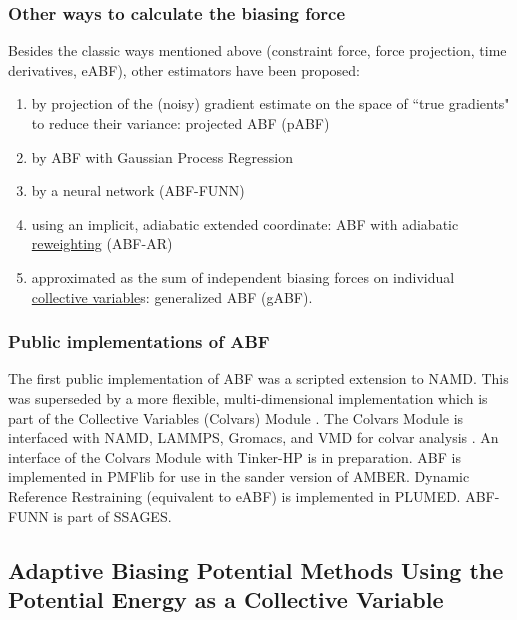 \documentclass[9pt,review]{livecoms}
\begin{document}
    
\subsubsection{Other ways to calculate the biasing force}
\label{sec:ABF_variants}

Besides the classic ways mentioned above (constraint force, force projection, time derivatives, eABF), other estimators have been proposed:
\begin{enumerate}
\item by projection of the (noisy) gradient estimate on the space of ``true gradients" to reduce their variance: projected ABF (pABF)\cite{lelievre-rousset-stoltz-07-a,Alrachid2015}
\item by ABF with Gaussian Process Regression\cite{Mones2016}
\item by a neural network (ABF-FUNN)\cite{Guo2018}
\item using an implicit, adiabatic extended coordinate: ABF with adiabatic \hyperlink{ref:Reweighting} {reweighting} (ABF-AR)\cite{Cao2014}
\item approximated as the sum of independent biasing forces on individual \hyperlink{ref:CV} {collective variable}s: generalized ABF (gABF)\cite{Chipot2011, Zhao2017}.
\end{enumerate}


\subsubsection{Public implementations of ABF}

The first public implementation of ABF\cite{Henin2004} was a scripted extension to NAMD.\cite{Phillips2020}
This was superseded by a more flexible, multi-dimensional implementation\cite{Henin2010a} which is part of the Collective Variables (Colvars) Module \cite{Fiorin2013}.
The Colvars Module is interfaced with NAMD\cite{Phillips2020}, LAMMPS\cite{Plimpton1995}, Gromacs\cite{Abraham2015}, and VMD\cite{Humphrey1996} for colvar analysis \cite{Henin2022dashboard}.
An interface of the Colvars Module with Tinker-HP\cite{Lagardere2018} is in preparation.
ABF is implemented in PMFlib\cite{kulhanek2011pmflib} for use in the sander version of AMBER.
Dynamic Reference Restraining\cite{Zheng2012} (equivalent to eABF) is implemented in PLUMED.\cite{Tribello2014}
ABF-FUNN is part of SSAGES.\cite{Sidky2018}


\subsection{Adaptive Biasing Potential Methods Using the Potential Energy as a Collective Variable}
\label{sec:abp_energy}
\end{document}
